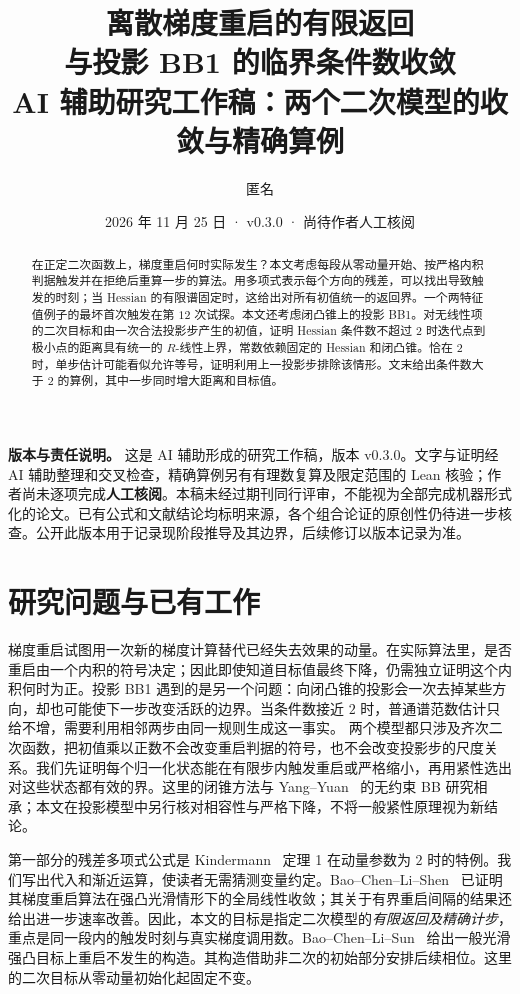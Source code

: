 \documentclass[11pt,a4paper,UTF8,fontset=fandol]{ctexart}
\title{离散梯度重启的有限返回\\与投影 BB1 的临界条件数收敛\\[3pt]\large AI 辅助研究工作稿：两个二次模型的收敛与精确算例}
\author{匿名}
\date{2026 年 11 月 25 日 · v0.3.0 · 尚待作者人工核阅}
\theoremstyle{remark}\newtheorem{remark}[theorem]{说明}
\begin{document}
\maketitle
\begin{abstract}
在正定二次函数上，梯度重启何时实际发生？本文考虑每段从零动量开始、按严格内积判据触发并在拒绝后重算一步的算法。用多项式表示每个方向的残差，可以找出导致触发的时刻；当 Hessian 的有限谱固定时，这给出对所有初值统一的返回界。一个两特征值例子的最坏首次触发在第 \(12\) 次试探。本文还考虑闭凸锥上的投影 BB1。对无线性项的二次目标和由一次合法投影步产生的初值，证明 Hessian 条件数不超过 \(2\) 时迭代点到极小点的距离具有统一的 \(R\)-线性上界，常数依赖固定的 Hessian 和闭凸锥。恰在 \(2\) 时，单步估计可能看似允许等号，证明利用上一投影步排除该情形。文末给出条件数大于 \(2\) 的算例，其中一步同时增大距离和目标值。
\end{abstract}

\noindent\textbf{版本与责任说明。}
这是 AI 辅助形成的研究工作稿，版本 v0.3.0。文字与证明经 AI 辅助整理和交叉检查，精确算例另有有理数复算及限定范围的 Lean 核验；作者尚未逐项完成\textbf{人工核阅}。本稿未经过期刊同行评审，不能视为全部完成机器形式化的论文。已有公式和文献结论均标明来源，各个组合论证的原创性仍待进一步核查。公开此版本用于记录现阶段推导及其边界，后续修订以版本记录为准。

\section{研究问题与已有工作}
梯度重启试图用一次新的梯度计算替代已经失去效果的动量。在实际算法里，是否重启由一个内积的符号决定；因此即使知道目标值最终下降，仍需独立证明这个内积何时为正。投影 BB1 遇到的是另一个问题：向闭凸锥的投影会一次去掉某些方向，却也可能使下一步改变活跃的边界。当条件数接近 \(2\) 时，普通谱范数估计只给不增，需要利用相邻两步由同一规则生成这一事实。
两个模型都只涉及齐次二次函数，把初值乘以正数不会改变重启判据的符号，也不会改变投影步的尺度关系。我们先证明每个归一化状态能在有限步内触发重启或严格缩小，再用紧性选出对这些状态都有效的界。这里的闭锥方法与 Yang--Yuan~\cite{yangyuan} 的无约束 BB 研究相承；本文在投影模型中另行核对相容性与严格下降，不将一般紧性原理视为新结论。

第一部分的残差多项式公式是 Kindermann~\cite{kindermann} 定理 1 在动量参数为 $2$ 时的特例。我们写出代入和渐近运算，使读者无需猜测变量约定。Bao--Chen--Li--Shen~\cite{bao2025} 已证明其梯度重启算法在强凸光滑情形下的全局线性收敛；其关于有界重启间隔的结果还给出进一步速率改善。因此，本文的目标是指定二次模型的\emph{有限返回及精确计步}，重点是同一段内的触发时刻与真实梯度调用数。Bao--Chen--Li--Sun~\cite{bao2026} 给出一般光滑强凸目标上重启不发生的构造。其构造借助非二次的初始部分安排后续相位。这里的二次目标从零动量初始化起固定不变。
\end{document}
